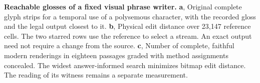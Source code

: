 \textbf{Reachable glosses of a fixed visual phrase writer.} \textbf{a}, Original complete glyph strips for a temporal use of a polysemous character, with the recorded gloss and the legal output closest to it. \textbf{b}, Physical edit distance over 23,147 reference cells. The two starred rows use the reference to select a stream. An exact output need not require a change from the source. \textbf{c}, Number of complete, faithful modern renderings in eighteen passages graded with method assignments concealed. The widest answer-informed search minimizes bitmap edit distance. The reading of its witness remains a separate measurement.
